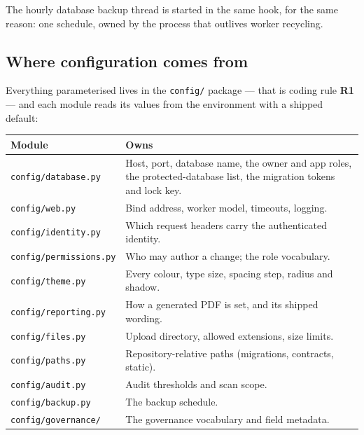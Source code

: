 \documentclass[11pt]{article}
\newcommand{\rulename}[1]{\textbf{#1}}
\begin{document}
The hourly database backup thread is started in the same hook, for the same reason: one
schedule, owned by the process that outlives worker recycling.

\subsection{Where configuration comes from}

Everything parameterised lives in the \texttt{config/} package --- that is coding rule
\rulename{R1} --- and each module reads its values from the environment with a shipped default:

\begin{longtable}{@{}p{}p{}@{}}
\toprule
\textbf{Module} & \textbf{Owns} \\
\midrule
\endhead
\texttt{config/database.py} & Host, port, database name, the owner and app roles,
  the protected-database list, the migration tokens and lock key. \\
\texttt{config/web.py} & Bind address, worker model, timeouts, logging. \\
\texttt{config/identity.py} & Which request headers carry the authenticated identity. \\
\texttt{config/permissions.py} & Who may author a change; the role vocabulary. \\
\texttt{config/theme.py} & Every colour, type size, spacing step, radius and shadow. \\
\texttt{config/reporting.py} & How a generated PDF is set, and its shipped wording. \\
\texttt{config/files.py} & Upload directory, allowed extensions, size limits. \\
\texttt{config/paths.py} & Repository-relative paths (migrations, contracts, static). \\
\texttt{config/audit.py} & Audit thresholds and scan scope. \\
\texttt{config/backup.py} & The backup schedule. \\
\texttt{config/governance/} & The governance vocabulary and field metadata. \\
\bottomrule
\end{longtable}
\end{document}

